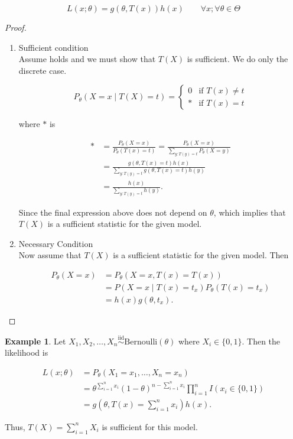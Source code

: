 \documentclass[12pt]{article}
\theoremstyle{definition}
\newtheorem*{example}{Example}
\begin{document}
\begin{equation*}
L(x; \theta) = g(\theta, T(x))h(x) \quad\quad \forall x; \forall \theta \in \Theta
\end{equation*} 

\begin{proof}
\begin{enumerate}[label = (\Roman*)]
\item Sufficient condition\\

Assume  holds and we must show that $T(X)$ is sufficient. We do only
the discrete case.

\begin{equation*}
P_{\theta}(X = x \mid T(X) = t) =
\begin{cases}
0 & \text{if } T(x) \neq t \\
* & \text{if } T(x) = t
\end{cases}  
\end{equation*}

where $*$ is

\begin{align*}
* &= \frac{P_{\theta}(X = x)}{P_{\theta}(T(x) = t)} 
= \frac{P_{\theta}(X = x)}{\sum\limits_{y:T(y) = t} P_{\theta}(X = y)} \\
&= \frac{g(\theta, T(x) = t)h(x)}{\sum\limits_{y:T(y) = t} g(\theta, T(x) = t)h(y)} \\
&= \frac{h(x)}{\sum\limits_{y:T(y) = t} h(y)}.
\end{align*}

Since the final expression above does not depend on $\theta$, which implies
that $T(X)$ is a sufficient statistic for the given model.

\item Necessary Condition \\

Now assume that $T(X)$ is a sufficient statistic for the given model. Then

\begin{align*}
P_{\theta}(X = x) &= P_{\theta}(X = x, T(x) = T(x)) \\
&= P(X = x \mid T(x) = t_x)P_{\theta}(T(x) = t_x) \\
&= h(x)g(\theta, t_x).
\end{align*}

\end{enumerate}
\end{proof}


\begin{example}
Let $X_1, X_2, \ldots, X_n \overset{\text{iid}}{\sim} \text{Bernoulli}(\theta)$
where $X_i \in \{0, 1\}$. Then the likelihood is

\begin{align*}
L(x; \theta) &= P_{\theta}(X_1 = x_1, \ldots, X_n = x_n) \\
&= \theta^{\sum\limits_{i = 1}^n x_i} (1 - \theta)^{n - \sum\limits_{i = 1}^n x_i}
\prod_{i=1}^n I(x_i \in \{0, 1\}) \\
&= g\left(\theta, T(x) = \sum_{i = 1}^n  x_i \right) h(x).
\end{align*}
 
Thus, $T(X) = \sum_{i = 1}^n X_i$ is sufficient for this model.
\end{example}
\end{document}
